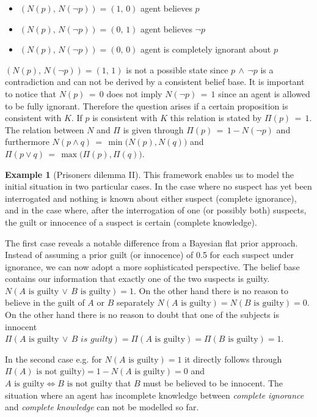 \documentclass[
]{report}
\theoremstyle{definition}
\newtheorem{example}{Example}[section]
\begin{document}
\begin{itemize}
  \item $(N(p), \, N(\lnot p)) = (1, \, 0)$ agent believes $p$
  \item $(N(p), \, N(\lnot p)) = (0, \, 1)$ agent believes $\lnot p$
  \item $(N(p), \, N(\lnot p)) = (0, \, 0)$ agent is completely ignorant about $p$
\end{itemize}

\((N(p), \, N(\lnot p)) = (1, \, 1)\) is not a possible state since
\(p \, \land \, \lnot p\) is a contradiction and can not be derived by a
consistent belief base. It is important to notice that
\(N(p) \, = \, 0\) does not imply \(N( \lnot p) \, = \, 1\) since an
agent is allowed to be fully ignorant. Therefore the question arises if
a certain proposition is consistent with \(K\). If \(p\) is consistent
with \(K\) this relation is stated by \(\Pi (p) \, = \, 1\). The
relation between \(N\) and \(\Pi\) is given through
\(\Pi (p) \, = \, 1 - N(\lnot p)\) and furthermore
\(N (p \land q) \, = \, \min \big( N(p), N(q) \big)\) and
\(\Pi (p \lor q) \, = \, \max \big( \Pi(p), \Pi(q) \big)\).

\begin{example}[Prisoners dilemma II]
This framework enables us to model the initial situation in two particular cases. In the case where no suspect has yet been interrogated and nothing is known about either suspect (complete ignorance), and in the case where, after the interrogation of one (or possibly both) suspects, the guilt or innocence of a suspect is certain (complete knowledge).

The first case reveals a notable difference from a Bayesian flat prior approach. Instead of assuming a prior guilt (or innocence) of 0.5 for each suspect under ignorance, we can now adopt a more sophisticated perspective. The belief base contains our information that exactly one of the two suspects is guilty. $N(A \text{ is guilty} \, \lor \, B \text{ is guilty}) = 1$. On the other hand there is no reason to believe in the guilt of $A$ or $B$ separately $N(A \text{ is guilty}) = N(B \text{ is guilty}) = 0$. On the other hand there is no reason to doubt that one of the subjects is innocent $\Pi(A \text{ is guilty} \, \lor \, B \textit{ is guilty}) = \Pi (A \text{ is guilty}) = \Pi (B \text{ is guilty}) = 1$. 

In the second case e.g. for $N(A \text{ is guilty}) = 1$ it directly follows through $\Pi(A) \text{ is not guilty}) = 1 -  N(A \text{ is guilty}) = 0$ and $A \text{ is guilty} \Leftrightarrow B \text{ is not guilty}$ that $B$ must be believed to be innocent. The situation where an agent has incomplete knowledge between \textit{complete ignorance} and \textit{complete knowledge} can not be modelled so far.
\end{example}
\end{document}
